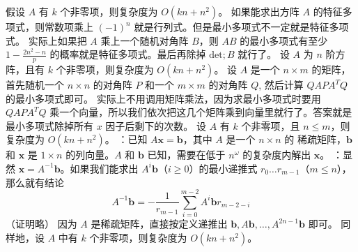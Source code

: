{}假设 $A$ 有 $k$ 个非零项，则复杂度为 $O(kn + n^2)$。\markdownRendererInterblockSeparator
{}
\markdownRendererSectionEnd \markdownRendererSectionBegin
{}\markdownRendererInterblockSeparator
{}如果能求出方阵 $A$ 的特征多项式，则常数项乘上 $(-1)^n$ 就是行列式。但是最小多项式不一定就是特征多项式。\markdownRendererParagraphSeparator
{}实际上如果把 $A$ 乘上一个随机对角阵 $B$，则 $AB$ 的最小多项式有至少 $1 - \frac {2n^2 - n} p$ 的概率就是特征多项式。最后再除掉 $\text{det};B$ 就行了。\markdownRendererParagraphSeparator
{}设 $A$ 为 $n$ 阶方阵，且有 $k$ 个非零项，则复杂度为 $O(kn + n ^ 2)$。\markdownRendererInterblockSeparator
{}
\markdownRendererSectionEnd \markdownRendererSectionBegin
{}\markdownRendererInterblockSeparator
{}设 $A$ 是一个 $n\times m$ 的矩阵，首先随机一个 $n\times n$ 的对角阵 $P$ 和一个 $m\times m$ 的对角阵 $Q$, 然后计算 $Q A P A^T Q$ 的最小多项式即可。\markdownRendererParagraphSeparator
{}实际上不用调用矩阵乘法，因为求最小多项式时要用 $Q A P A^T Q$ 乘一个向量，所以我们依次把这几个矩阵乘到向量里就行了。答案就是最小多项式除掉所有 $x$ 因子后剩下的次数。\markdownRendererParagraphSeparator
{}设 $A$ 有 $k$ 个非零项，且 $n \le m$，则复杂度为 $O(kn + n ^ 2)$。\markdownRendererInterblockSeparator
{}
\markdownRendererSectionEnd \markdownRendererSectionBegin
{}\markdownRendererInterblockSeparator
{}：已知 $A \boldsymbol{x} = \boldsymbol{b}$，其中 $A$ 是一个 $n \times n$ 的  稀疏矩阵，$\boldsymbol{b}$ 和 $\boldsymbol{x}$ 是 $1 \times n$ 的列向量。$A$ 和 $\boldsymbol{b}$ 已知，需要在低于 $n^\omega$ 的复杂度内解出 $\boldsymbol{x}$。\markdownRendererParagraphSeparator
{}：显然 $\boldsymbol{x} = A^{-1} \boldsymbol{b}$。如果我们能求出 ${A^i \boldsymbol{b}}$（$i \ge 0$）的最小递推式 ${r_0 \dots r_{m - 1}}$（$m \le n$），那么就有结论\markdownRendererParagraphSeparator
{}$$A^{-1} \boldsymbol{b} = -\frac{1}{r_{m - 1}} \sum_{i = 0}^{m - 2} A^i \boldsymbol{b} r_{m - 2 - i}$$\markdownRendererParagraphSeparator
{}（证明略）\markdownRendererParagraphSeparator
{}因为 $A$ 是稀疏矩阵，直接按定义递推出 $\boldsymbol{b}, A \boldsymbol{b}, \dots, A^{2n - 1} \boldsymbol{b}$ 即可。\markdownRendererParagraphSeparator
{}同样地，设 $A$ 中有 $k$ 个非零项，则复杂度为 $O(kn + n^2)$。\markdownRendererInterblockSeparator
{}
\markdownRendererSectionEnd 
\markdownRendererSectionEnd \markdownRendererSectionBegin
{}\markdownRendererInterblockSeparator
